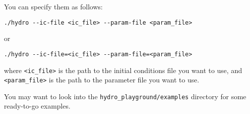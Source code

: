 You can specify them as follows:

\begin{lstlisting}
./hydro --ic-file <ic_file> --param-file <param_file>
\end{lstlisting}

or

\begin{lstlisting}
./hydro --ic-file=<ic_file> --param-file=<param_file>
\end{lstlisting}

where \verb|<ic_file>| is the path to the initial conditions file you want to
use, and \verb|<param_file>| is the path to the parameter file you want to use.

You may want to look into the \verb|hydro_playground/examples| directory for
some ready-to-go examples.



